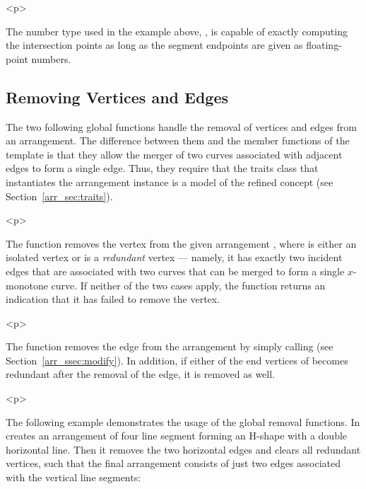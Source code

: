 
\begin{ccHtmlOnly}<p>\end{ccHtmlOnly}
The number type used in the example above,
, is capable of exactly computing the
intersection points as long as the segment endpoints are given as
floating-point numbers.

\subsection{Removing Vertices and Edges}
\label{arr_ssec:gl_remove}
%
The two following global functions handle the removal of vertices
and edges from an arrangement. The difference between them and the
member functions of the  template is that they
allow the merger of two curves associated with adjacent edges to
form a single edge. Thus, they require that the traits class that
instantiates the arrangement instance is a model of the refined
 concept (see
Section~\ref{arr_sec:traits}).

\begin{ccHtmlOnly}<p>\end{ccHtmlOnly}
The function  removes the vertex
 from the given arrangement , where  is
either an isolated vertex or is a {\em redundant} vertex ---
namely, it has exactly two incident edges that are associated with
two curves that can be merged to form a single $x$-monotone curve.
If neither of the two cases apply, the function returns an
indication that it has failed to remove the vertex.

\begin{ccHtmlOnly}<p>\end{ccHtmlOnly}
The function  removes the edge 
from the arrangement by simply calling 
(see Section~\ref{arr_ssec:modify}). In addition, if either of the
end vertices of  becomes redundant after the removal of the
edge, it is removed as well.

\begin{ccHtmlOnly}<p>\end{ccHtmlOnly}
The following example demonstrates the usage of the global removal
functions. In creates an arrangement of four line segment forming
an H-shape with a double horizontal line. Then it removes the two
horizontal edges and clears all redundant vertices, such that the
final arrangement consists of just two edges associated with the
vertical line segments:

